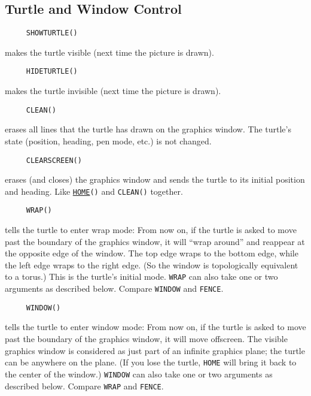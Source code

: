 

\subsection{Turtle and Window Control}
\label{logoturtle:TWC}

\begin{verbatim}
     SHOWTURTLE()
\end{verbatim}
\label{logoturtle:showturtle}
makes the turtle visible (next time the picture is drawn).

\begin{verbatim}
     HIDETURTLE()
\end{verbatim}
\label{logoturtle:hideturtle}
makes the turtle invisible (next time the picture is drawn).

\begin{verbatim}
     CLEAN()
\end{verbatim}
erases all lines that the turtle has drawn on the graphics window.
The turtle's state (position, heading, pen mode, etc.) is not changed.

\begin{verbatim}
     CLEARSCREEN()
\end{verbatim}
erases (and closes) the graphics window and sends the turtle to its
initial position and heading.  Like
\texttt{\hyperref[logoturtle:home]{HOME}()} and \texttt{CLEAN()}
together.

\begin{verbatim}
     WRAP()
\end{verbatim}
tells the turtle to enter wrap mode: From now on, if the turtle is
asked to move past the boundary of the graphics window, it will ``wrap
around'' and reappear at the opposite edge of the window.  The top
edge wraps to the bottom edge, while the left edge wraps to the right
edge.  (So the window is topologically equivalent to a torus.)  This
is the turtle's initial mode.  \texttt{WRAP} can also take one or two
arguments as described below.  Compare \texttt{WINDOW} and
\texttt{FENCE}.

\begin{verbatim}
     WINDOW()
\end{verbatim}
tells the turtle to enter window mode: From now on, if the turtle is
asked to move past the boundary of the graphics window, it will move
offscreen.  The visible graphics window is considered as just part of
an infinite graphics plane; the turtle can be anywhere on the plane.
(If you lose the turtle, \texttt{HOME} will bring it back to the
center of the window.)  \texttt{WINDOW} can also take one or two
arguments as described below.  Compare \texttt{WRAP} and
\texttt{FENCE}.

